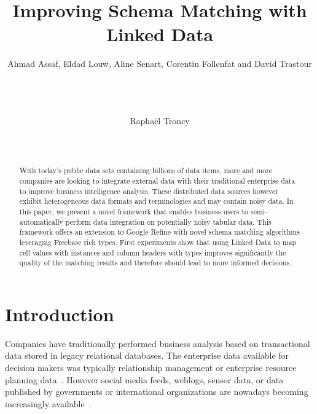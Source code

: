 \documentclass{sig-alternate}
\begin{document}
\title{Improving Schema Matching with Linked Data}

\author{
\alignauthor
Ahmad Assaf, Eldad Louw, Aline Senart, Corentin Follenfat and David Trastour\\
       \\
       \\
       \\
\and
\alignauthor
Rapha\"el Troncy \\
       \\
       \\
}
\maketitle


\begin{abstract}
With today's public data sets containing billions of data items, more and more companies are looking to integrate external data with their traditional enterprise data to improve business intelligence analysis. These distributed data sources however exhibit heterogeneous data formats and terminologies and may contain noisy data. In this paper, we present a novel framework that enables business users to semi-automatically perform data integration on potentially noisy tabular data. This framework offers an extension to Google Refine with novel schema matching algorithms leveraging Freebase rich types. First experiments show that using Linked Data to map cell values with instances and column headers with types improves significantly the quality of the matching results and therefore should lead to more informed decisions.
\end{abstract}


\section{Introduction}

Companies have traditionally performed business analysis based on transactional data stored in legacy relational databases. The enterprise data available for decision makers was typically relationship management or enterprise resource planning data~\cite{Hernandez:2013:DDM:2462633}. However social media feeds, weblogs, sensor data, or data published by governments or international organizations are nowadays becoming increasingly available~\cite{citeulike:9784019}.
\end{document}
